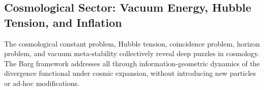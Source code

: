 
\subsection{Cosmological Sector: Vacuum Energy, Hubble Tension, and Inflation}
\label{subsec:cosmologicalApplications}

\begin{overview}
The cosmological constant problem, Hubble tension, coincidence problem, horizon problem, and vacuum meta-stability collectively reveal deep puzzles in cosmology. The Barg framework addresses all through information-geometric dynamics of the divergence functional under cosmic expansion, without introducing new particles or ad-hoc modifications.
\end{overview}


